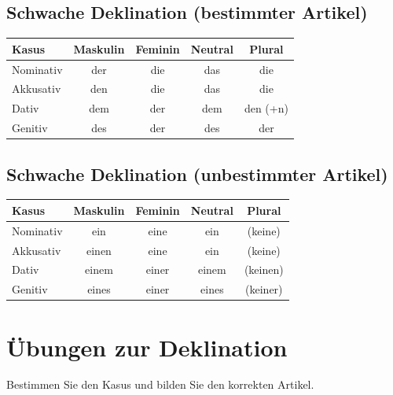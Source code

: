 \subsection{Schwache Deklination (bestimmter Artikel)}
\begin{center}
\begin{tabular}{|l|c|c|c|c|}
\hline
\textbf{Kasus} & \textbf{Maskulin} & \textbf{Feminin} & \textbf{Neutral} & \textbf{Plural} \\ \hline
Nominativ & der & die & das & die \\ \hline
Akkusativ & den & die & das & die \\ \hline
Dativ & dem & der & dem & den (+n) \\ \hline
Genitiv & des & der & des & der \\ \hline
\end{tabular}
\end{center}

\subsection{Schwache Deklination (unbestimmter Artikel)}
\begin{center}
\begin{tabular}{|l|c|c|c|c|}
\hline
\textbf{Kasus} & \textbf{Maskulin} & \textbf{Feminin} & \textbf{Neutral} & \textbf{Plural} \\ \hline
Nominativ & ein & eine & ein & (keine) \\ \hline
Akkusativ & einen & eine & ein & (keine) \\ \hline
Dativ & einem & einer & einem & (keinen) \\ \hline
Genitiv & eines & einer & eines & (keiner) \\ \hline
\end{tabular}
\end{center}

\section{Übungen zur Deklination}
\label{sec:DeklinationUebungen}

\begin{tcolorbox}[title={Aufgabe}]
Bestimmen Sie den Kasus und bilden Sie den korrekten Artikel.
\end{tcolorbox}

